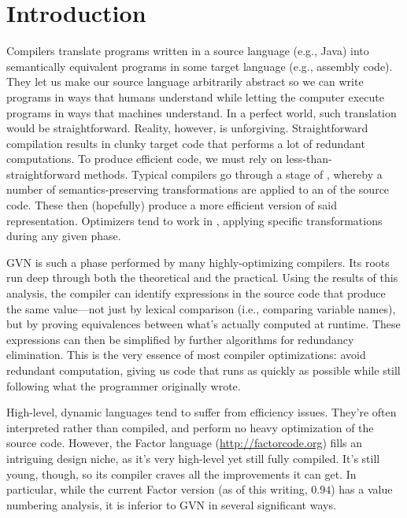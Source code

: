 \chapter{Introduction}\label{sec:intro}

Compilers translate programs written in a source language (e.g., Java) into
semantically equivalent programs in some target language (e.g., assembly code).
They let us make our source language arbitrarily abstract so we can write
programs in ways that humans understand while letting the computer execute
programs in ways that machines understand.  In a perfect world, such
translation would be straightforward.  Reality, however, is unforgiving.
Straightforward compilation results in clunky target code that performs a lot
of redundant computations.  To produce efficient code, we must rely on
less-than-straightforward methods.  Typical compilers go through a stage of
, whereby a number of semantics-preserving transformations
are applied to an  of the source code.  These then
(hopefully) produce a more efficient version of said representation.
Optimizers tend to work in , applying specific transformations
during any given phase.

\Gls{GVN} is such a phase performed by many highly-optimizing compilers.  Its
roots run deep through both the theoretical and the practical.  Using the
results of this analysis, the compiler can identify expressions in the source
code that produce the same value---not just by lexical comparison (i.e.,
comparing variable names), but by proving equivalences between what's actually
computed at runtime.  These expressions can then be simplified by further
algorithms for redundancy elimination.  This is the very essence of most
compiler optimizations: avoid redundant computation, giving us code that runs
as quickly as possible while still following what the programmer originally
wrote.

High-level, dynamic languages tend to suffer from efficiency issues.  They're
often interpreted rather than compiled, and perform no heavy optimization of
the source code.  However, the Factor language (\url{http://factorcode.org})
fills an intriguing design niche, as it's very high-level yet still fully
compiled.  It's still young, though, so its compiler craves all the
improvements it can get.  In particular, while the current Factor version (as
of this writing, $0.94$) has a  value numbering analysis, it is
inferior to \gls{GVN} in several significant ways.

